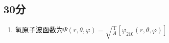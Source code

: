 
\subsection{30分}
\begin{enumerate}
\item 氢原子波函数为$\varPsi (r,\theta,\varphi)=\sqrt{\frac{1}{A}}[\varphi_{210}(r,\theta,\varphi)]$
\end{enumerate}